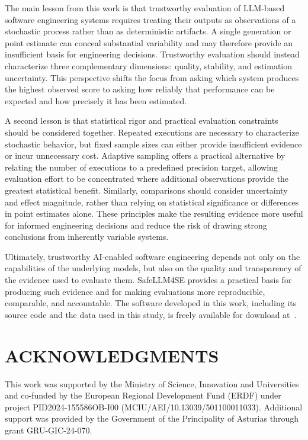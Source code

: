 \documentclass{IEEEcsmag}
\begin{document}
The main lesson from this work is that trustworthy evaluation of LLM-based software engineering systems requires treating their outputs as observations of a stochastic process rather than as deterministic artifacts. A single generation or point estimate can conceal substantial variability and may therefore provide an insufficient basis for engineering decisions. Trustworthy evaluation should instead characterize three complementary dimensions: quality, stability, and estimation uncertainty. This perspective shifts the focus from asking which system produces the highest observed score to asking how reliably that performance can be expected and how precisely it has been estimated.

A second lesson is that statistical rigor and practical evaluation constraints should be considered together. Repeated executions are necessary to characterize stochastic behavior, but fixed sample sizes can either provide insufficient evidence or incur unnecessary cost. Adaptive sampling offers a practical alternative by relating the number of executions to a predefined precision target, allowing evaluation effort to be concentrated where additional observations provide the greatest statistical benefit. Similarly, comparisons should consider uncertainty and effect magnitude, rather than relying on statistical significance or differences in point estimates alone. These principles make the resulting evidence more useful for informed engineering decisions and reduce the risk of drawing strong conclusions from inherently variable systems.

Ultimately, trustworthy AI-enabled software engineering depends not only on the capabilities of the underlying models, but also on the quality and transparency of the evidence used to evaluate them. SafeLLM4SE provides a practical basis for producing such evidence and for making evaluations more reproducible, comparable, and accountable. The software developed in this work, including its source code and the data used in this study, is freely available for download at~\cite{ref}.


\vspace*{-8pt}
\section{ACKNOWLEDGMENTS}
This work was supported by the Ministry of Science, Innovation and Universities and co-funded by the European Regional Development Fund (ERDF) under project PID2024-155586OB-I00 (MCIU/AEI/10.13039/501100011033). Additional support was provided by the Government of the Principality of Asturias through grant GRU-GIC-24-070.
\end{document}
